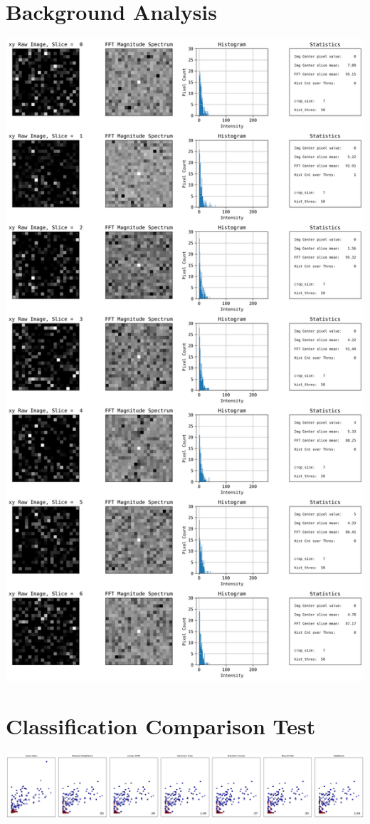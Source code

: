 \documentclass{neu_handout}
\begin{document}
\section{Background Analysis}
\includegraphics[width=0.7\linewidth]{background-xy-0}

\section{Classification Comparison Test}
\includegraphics[width=0.7\linewidth]{classification-test}
\end{document}
